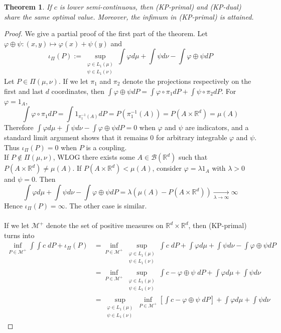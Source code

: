 \documentclass{article}
\newtheorem{thm}{Theorem}[section]
\theoremstyle{definition}
\theoremstyle{remark}
\begin{document}
\begin{thm}
If $c$ is lower semi-continuous, then (KP-primal) and (KP-dual) share the same optimal value. Moreover, the infimum in (KP-primal) is attained.
\end{thm}

\begin{proof}
We give a partial proof of the first part of the theorem. Let $\varphi\oplus \psi:(x,y) \mapsto \varphi(x)+\psi(y)$ and $$\iota_\Pi(P) := \sup_{\substack{\varphi \in L_1(\mu)\\ \psi \in L_1(\nu)}} \int \varphi d\mu + \int \psi d\nu - \int \varphi\oplus \psi dP$$
Let $P\in \Pi(\mu, \nu)$. If we let $\pi_1$ and $\pi_2$ denote the projections respectively on the first and last $d$ coordinates, then $\int \varphi\oplus \psi dP = \int \varphi \circ \pi_1 dP + \int \psi \circ \pi_2 dP$. For $\varphi = 1_A$, $$\int \varphi \circ \pi_1 dP = \int 1_{\pi_1^{-1}(A)} dP = P(\pi_1^{-1}(A)) = P(A\times \mathbb R^d) = \mu(A)$$
Therefore $\int \varphi d\mu + \int \psi d\nu - \int \varphi\oplus \psi dP = 0$ when $\varphi$ and $\psi$ are indicators, and a standard limit argument shows that it remains $0$ for arbitrary integrable $\varphi$ and $\psi$. Thus $\iota_\Pi(P)=0$ when $P$ is a coupling.\\
If $P\notin \Pi(\mu, \nu)$, WLOG there exists some $A\in \mathcal B(\mathbb R^d)$ such that $P(A\times \mathbb R^d)\neq \mu(A)$. If $P(A\times \mathbb R^d)< \mu(A)$, consider $\varphi = \lambda 1_A$ with $\lambda >0$ and $\psi = 0$. Then $$\int \varphi d\mu + \int \psi d\nu - \int \varphi\oplus \psi dP = \lambda (\mu(A) - P(A\times \mathbb R^d)) \xrightarrow[\lambda \to \infty]{} \infty$$ Hence $\iota_\Pi(P)=\infty$. The other case is similar.\\
\\
If we let $\mathcal M^+$ denote the set of positive measures on $\mathbb R^d\times \mathbb R^d$, then (KP-primal) turns into 
$$\begin{aligned}
	\inf_{P\in \mathcal M^+} \int\int c\; dP +  \iota_\Pi(P) 
	&= \inf_{P\in \mathcal M^+} \sup_{\substack{\varphi \in L_1(\mu)\\ \psi \in L_1(\nu)}}  \int c\; dP + \int \varphi d\mu + \int \psi d\nu - \int \varphi\oplus \psi dP \\
	&= \inf_{P\in \mathcal M^+} \sup_{\substack{\varphi \in L_1(\mu)\\ \psi \in L_1(\nu)}}  \int c - \varphi\oplus \psi\; dP + \int \varphi d\mu + \int \psi d\nu \\
	&= \sup_{\substack{\varphi \in L_1(\mu)\\ \psi \in L_1(\nu)}} \inf_{P\in \mathcal M^+}   \left[\int c - \varphi\oplus \psi\; dP\right] + \int \varphi d\mu + \int \psi d\nu

\end{aligned}$$
\end{proof}
\end{document}
